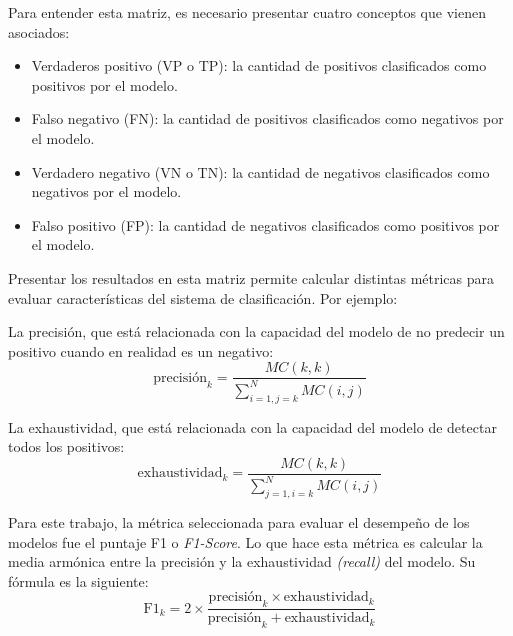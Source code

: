 Para entender esta matriz, es necesario presentar cuatro conceptos que vienen asociados:
\begin{itemize}
	\item Verdaderos positivo (VP o TP): la cantidad de positivos clasificados como positivos por el modelo.
	\item Falso negativo (FN): la cantidad de positivos clasificados como negativos por el modelo.
	\item Verdadero negativo (VN o TN): la cantidad de negativos clasificados como negativos por el modelo.
	\item Falso positivo (FP): la cantidad de negativos clasificados como positivos por el modelo.
\end{itemize}

Presentar los resultados en esta matriz permite calcular distintas métricas para evaluar características del sistema de clasificación. Por ejemplo:

La precisión, que está relacionada con la capacidad del modelo de no predecir un positivo cuando en realidad es un negativo:
\begin{equation}
\text{precisión}_{k}=\frac{MC(k,k)}{\sum_{i=1,j=k}^{N}MC(i,j)}
\end{equation}

La exhaustividad, que está relacionada con la capacidad del modelo de detectar todos los positivos:
\begin{equation}
\text{exhaustividad}_{k}=\frac{MC(k,k)}{\sum_{j=1,i=k}^{N}MC(i,j)}
\end{equation}

Para este trabajo, la métrica seleccionada para evaluar el desempeño de los modelos fue el puntaje F1 o \textit{F1-Score}. Lo que hace esta métrica es calcular la media armónica entre la precisión y la exhaustividad \textit{(recall)} del modelo. Su fórmula es la siguiente:
\begin{equation}
\text{F1}_{k}=2\times \frac{\text{precisión}_{k}\times \text{exhaustividad}_{k}}{\text{precisión}_{k}+ \text{exhaustividad}_{k}}
\end{equation}

